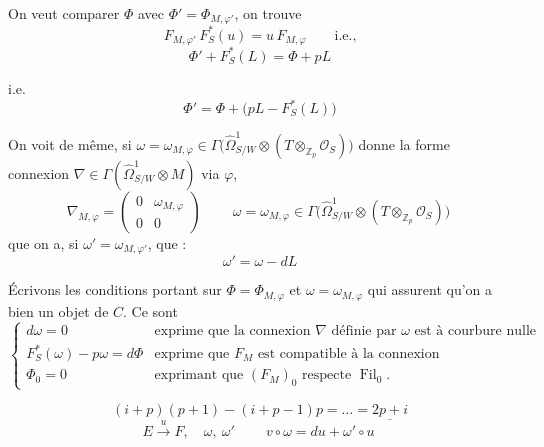 \documentclass[11pt,a4paper]{article}
\begin{document}
On veut comparer $\Phi$ avec $\Phi' = \Phi_{M,\varphi'}$, on trouve
\[
F_{M,\varphi'}\, F_S^{*}(u) = u\, F_{M,\varphi} \qquad \text{i.e.,}
\]
\struck{\ill{}}
\[
\Phi' + F_S^{*}(L) = \Phi + pL
\]


i.e.
\[
\boxed{\ \Phi' = \Phi + \bigl(pL - F_S^{*}(L)\bigr)\ }
\]

On voit de même, si $\omega = \omega_{M,\varphi} \in
\Gamma\bigl(\hat{\Omega}^1_{S/W} \otimes (T \otimes_{\mathbb{Z}_p}
\mathcal{O}_S)\bigr)$ donne la forme connexion $\nabla \in
\Gamma(\hat{\Omega}^1_{S/W} \otimes M)$ via $\varphi$,
\[
\nabla_{M,\varphi} = \begin{pmatrix} 0 & \omega_{M,\varphi} \\ 0 & 0 \end{pmatrix}
\qquad
\boxed{\ \omega = \omega_{M,\varphi} \in \Gamma\bigl(\hat{\Omega}^1_{S/W}
\otimes (T \otimes_{\mathbb{Z}_p} \mathcal{O}_S)\bigr)\ }
\]
que on a, si $\omega' = \omega_{M,\varphi'}$, que :
\[
\boxed{\ \omega' = \omega - dL\ }
\]

Écrivons les conditions portant sur \struck{\ill{}} $\Phi = \Phi_{M,\varphi}$
et $\omega = \omega_{M,\varphi}$ qui assurent qu'on a bien un objet de $C$.
Ce sont
\[
\begin{cases}
\boxed{d\omega = 0} & \text{exprime que la connexion } \nabla
\text{ définie par } \omega \text{ est à courbure nulle} \\
\boxed{F_S^{*}(\omega) - p\omega = d\Phi} & \text{exprime que } F_M
\text{ est compatible à la connexion} \\
\boxed{\Phi_0 = 0} & \text{exprimant que } (F_M)_0 \text{ respecte }
\operatorname{Fil}_0 .
\end{cases}
\]


\[
(i+p)(p+1) - (i+p-1)p = \ldots = \underline{2p+i}
\]
\[
E \xrightarrow{\ u\ } F, \quad \omega, \ \omega' \qquad
\boxed{\ v \circ \omega = du + \omega' \circ u\ }
\]

\end{document}
